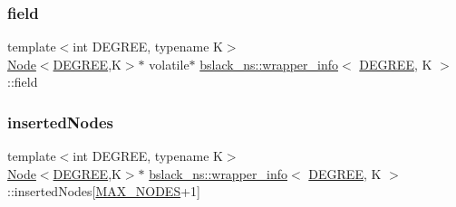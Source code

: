 \mbox{\label{classbslack__ns_1_1wrapper__info_a2990081b668c96ebdae6412f1b8086ff}} 
\subsubsection{\texorpdfstring{field}{field}}
{\footnotesize\ttfamily template$<$int D\+E\+G\+R\+EE, typename K$>$ \\
\hyperlink{structbslack__ns_1_1Node}{Node}$<$\hyperlink{brown__sigouin__abtree__kcas_2adapter_8h_a5d88b17d70c985f2f2b8e987037fd6dd}{D\+E\+G\+R\+EE},K$>$$\ast$ volatile$\ast$ \hyperlink{classbslack__ns_1_1wrapper__info}{bslack\+\_\+ns\+::wrapper\+\_\+info}$<$ \hyperlink{brown__sigouin__abtree__kcas_2adapter_8h_a5d88b17d70c985f2f2b8e987037fd6dd}{D\+E\+G\+R\+EE}, K $>$\+::field}

\mbox{\label{classbslack__ns_1_1wrapper__info_a17f79b301b37cc9167592860998a8aa8}} 
\subsubsection{\texorpdfstring{inserted\+Nodes}{insertedNodes}}
{\footnotesize\ttfamily template$<$int D\+E\+G\+R\+EE, typename K$>$ \\
\hyperlink{structbslack__ns_1_1Node}{Node}$<$\hyperlink{brown__sigouin__abtree__kcas_2adapter_8h_a5d88b17d70c985f2f2b8e987037fd6dd}{D\+E\+G\+R\+EE},K$>$$\ast$ \hyperlink{classbslack__ns_1_1wrapper__info}{bslack\+\_\+ns\+::wrapper\+\_\+info}$<$ \hyperlink{brown__sigouin__abtree__kcas_2adapter_8h_a5d88b17d70c985f2f2b8e987037fd6dd}{D\+E\+G\+R\+EE}, K $>$\+::inserted\+Nodes\mbox{[}\hyperlink{classbslack__ns_1_1wrapper__info_ab5bcd31a5ba96938aa04b6e43da441c4}{M\+A\+X\+\_\+\+N\+O\+D\+ES}+1\mbox{]}}

\mbox{\label{classbslack__ns_1_1wrapper__info_ab5bcd31a5ba96938aa04b6e43da441c4}} 
